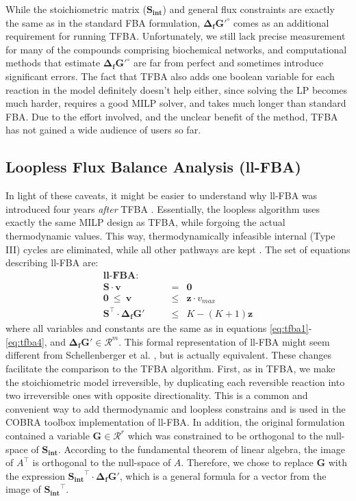 \documentclass[twocolumn]{article}
\begin{document}
While the stoichiometric matrix ($\mathbf{S_{int}}$) and general flux constraints are exactly the same as in the standard FBA formulation, $\mathbf{\Delta_f G'^\circ}$ comes as an additional requirement for running TFBA. Unfortunately, we still lack precise measurement for many of the compounds comprising biochemical networks, and computational methods that estimate $\mathbf{\Delta_f G'^\circ}$ \cite{Jankowski2008-hd,Noor2012-mp,Noor2013-an,Jinich2014-nv} are far from perfect and sometimes introduce significant errors. The fact that TFBA also adds one boolean variable for each reaction in the model definitely doesn't help either, since solving the LP becomes much harder, requires a good MILP solver, and takes much longer than standard FBA. Due to the effort involved, and the unclear benefit of the method, TFBA has not gained a wide audience of users so far.

\subsection*{Loopless Flux Balance Analysis (ll-FBA)}
In light of these caveats, it might be easier to understand why ll-FBA was introduced four years \emph{after} TFBA \cite{Schellenberger2011-bq}. Essentially, the loopless algorithm uses exactly the same MILP design as TFBA, while forgoing the actual thermodynamic values. This way, thermodynamically infeasible internal (Type III) cycles are eliminated, while all other pathways are kept \cite{Noor2012-qb}. The set of equations describing ll-FBA are:
\begin{eqnarray}
\textbf{ll-FBA:~~~~~~~~} && \nonumber\\
\mathbf{S} \cdot \mathbf{v} &=& \mathbf{0} \label{eq:llfba1} \\
\mathbf{0} ~\leq~ \mathbf{v} &\leq & \mathbf{z} \cdot v_{max} \label{eq:llfba2} \\
\mathbf{S} ^\top \cdot \mathbf{\Delta_f G'} &\leq & K - (K+1)\mathbf{z} \label{eq:llfba3}
\end{eqnarray}
where all variables and constants are the same as in equations \ref{eq:tfba1}-\ref{eq:tfba4}, and $\mathbf{\Delta_f G'} \in \mathcal{R}^{m}$. This formal representation of ll-FBA might seem different from Schellenberger et al. \cite{Schellenberger2011-bq}, but is actually equivalent. These changes facilitate the comparison to the TFBA algorithm. First, as in TFBA, we make the stoichiometric model irreversible, by duplicating each reversible reaction into two irreversible ones with opposite directionality. This is a common and convenient way to add thermodynamic and loopless constrains and is used in the COBRA toolbox implementation of ll-FBA. In addition, the original formulation contained a variable $\mathbf{G} \in \mathcal{R}^{r}$ which was constrained to be orthogonal to the null-space of $\mathbf{S_{int}}$. According to the fundamental theorem of linear algebra, the image of $A^\top$ is orthogonal to the null-space of $A$. Therefore, we chose to replace $\mathbf{G}$ with the expression $\mathbf{S_{int}} ^\top \cdot \mathbf{\Delta_f G'}$, which is a general formula for a vector from the image of $\mathbf{S_{int}} ^\top$.
\end{document}

